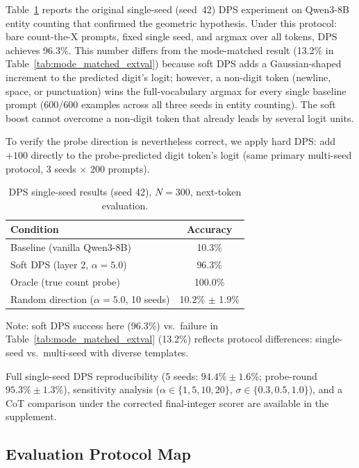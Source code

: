 \documentclass{article}
\begin{document}
Table~\ref{tab:dps} reports the original single-seed (seed~42) DPS experiment
on Qwen3-8B entity counting that confirmed the geometric hypothesis. Under this
protocol: bare count-the-X prompts, fixed single seed, and argmax over all
tokens, DPS achieves 96.3\%. This number differs from the mode-matched result
(13.2\% in Table~\ref{tab:mode_matched_extval}) because soft DPS adds a
Gaussian-shaped increment to the predicted digit's logit; however, a non-digit
token (newline, space, or punctuation) wins the full-vocabulary argmax for
every single baseline prompt (600/600 examples across all three seeds in entity
counting). The soft boost cannot overcome a non-digit token that already leads
by several logit units.

To verify the probe direction is nevertheless correct, we apply hard DPS: add
$+100$ directly to the probe-predicted digit token's logit (same primary
multi-seed protocol, 3 seeds $\times$ 200 prompts).

\begin{table}[h]
\centering
\caption{DPS single-seed results (seed 42), $N{=}300$, next-token evaluation.}
\label{tab:dps}
\begin{tabular}{lc}
\toprule
Condition & Accuracy \\
\midrule
Baseline (vanilla Qwen3-8B) & 10.3\% \\
Soft DPS (layer 2, $\alpha=5.0$) & 96.3\% \\
Oracle (true count probe) & 100.0\% \\
Random direction ($\alpha=5.0$, 10 seeds) & 10.2\% $\pm$ 1.9\% \\
\bottomrule
\end{tabular}
\vspace{3pt}
\par\scriptsize
Note: soft DPS success here (96.3\%) vs.\ failure in Table~\ref{tab:mode_matched_extval} (13.2\%) reflects
protocol differences: single-seed vs.\ multi-seed with diverse templates.
\end{table}

Full single-seed DPS reproducibility (5 seeds: $94.4\% \pm 1.6\%$; probe-round
$95.3\% \pm 1.3\%$), sensitivity analysis ($\alpha \in \{1,5,10,20\}$,
$\sigma \in \{0.3, 0.5, 1.0\}$), and a CoT comparison under the corrected
final-integer scorer are available in the supplement.

\subsection{Evaluation Protocol Map}
\label{sec:protocol_map}
\end{document}
